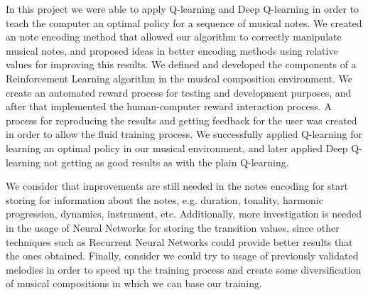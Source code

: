 In this project we were able to apply Q-learning and Deep Q-learning in order to teach the computer an optimal policy for a sequence of musical notes. We created an note encoding method that allowed our algorithm to correctly manipulate musical notes, and proposed ideas in better encoding methods using relative values for improving this results. We defined and developed the components of a Reinforcement Learning algorithm in the musical composition environment. We create an automated reward process for testing and development purposes, and after that implemented the human-computer reward interaction process. A process for reproducing the results and getting feedback for the user was created in order to allow the fluid training process. We successfully applied Q-learning for learning an optimal policy in our musical environment, and later applied Deep Q-learning not getting as good results as with the plain Q-learning.

We consider that improvements are still needed in the notes encoding for start storing for information about the notes, e.g. duration, tonality, harmonic progression, dynamics, instrument, etc. Additionally, more investigation is needed in the usage of Neural Networks for storing the transition values, since other techniques such as Recurrent Neural Networks could provide better results that the ones obtained. Finally, consider we could try to usage of previously validated melodies in order to speed up the training process and create some diversification of musical compositions in which we can base our training.